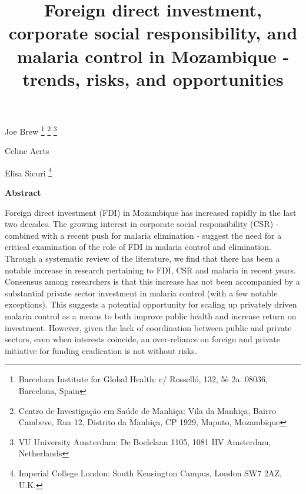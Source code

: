 \documentclass[]{article}
\title{Foreign direct investment, corporate social responsibility, and malaria
control in Mozambique - trends, risks, and opportunities}
\author{}
\date{}
\let\rmarkdownfootnote\footnote%
\def\footnote{\protect\rmarkdownfootnote}
\newcommand{\footremember}[2]{%
    \footnote{#2}
    \newcounter{#1}
    \setcounter{#1}{\value{footnote}}%
}
\newcommand{\footrecall}[1]{%
    \footnotemark[\value{#1}]%
}
\begin{document}
\maketitle

\begin{center}
\begin{large}

Joe Brew\footremember{isglobal}{Barcelona Institute for Global Health: c/ Rosselló, 132, 5è 2a. 08036, Barcelona, Spain}\footremember{cism}{Centro de Investigação em Saúde de Manhiça: Vila da Manhiça, Bairro Cambeve, Rua 12, Distrito da Manhiça, CP 1929, Maputo, Mozambique}\footremember{vu}{VU University Amsterdam: De Boelelaan 1105, 1081 HV Amsterdam, Netherlands}
Celine Aerts\footrecall{isglobal}
Elisa Sicuri\footrecall{isglobal}\footrecall{cism}\footremember{icl}{Imperial College London: South Kensington Campus, London SW7 2AZ, U.K.}

\end{large}
\end{center}

\vspace{5mm}

\begin{center}
\textbf{Abstract}  
\end{center}

\vspace{5mm}

\begin{center}
\begin{changemargin}{3cm}{3cm} 



Foreign direct investment (FDI) in Mozambique has increased rapidly in the last two decades. The growing interest in corporate social responsibility (CSR) - combined with a recent push for malaria elimination - suggest the need for a critical examination of the role of FDI in malaria control and elimination. Through a systematic review of the literature, we find that there has been a notable increase in research pertaining to FDI, CSR and malaria in recent years. Consensus among researchers is that this increase has not been accompanied by a substantial private sector investment in malaria control (with a few notable exceptions). This suggests a potential opportunity for scaling up privately driven malaria control as a means to both improve public health and increase return on investment. However, given the lack of coordination between public and private sectors, even when interests coincide, an over-reliance on foreign and private initiative for funding eradication is not without risks.

\end{changemargin}
\end{center}
\end{document}

